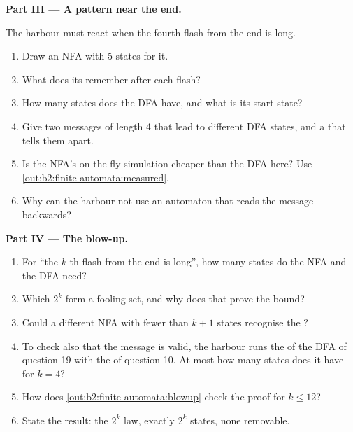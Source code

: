 \begin{problem}
\medskip\noindent\textbf{Part III --- A pattern near the end.}\par\nopagebreak
The harbour must react when the fourth flash from the end is long.
\begin{enumerate}[resume, beginpenalty=10000]
\item Draw an NFA with 5 states for it.
\item What does its  remember after each flash?
\item How many states does the DFA have, and what is its start state?
\item Give two messages of length 4 that lead to different DFA states, and a  that tells them apart.
\item Is the NFA's on-the-fly simulation cheaper than the DFA here? Use \cref{out:b2:finite-automata:measured}.
\item Why can the harbour not use an automaton that reads the message backwards?
\end{enumerate}

\medskip\noindent\textbf{Part IV --- The blow-up.}\par\nopagebreak
\begin{enumerate}[resume, beginpenalty=10000]
\item For ``the $k$-th flash from the end is long'', how many states do the NFA and the DFA need?
\item Which $2^k$  form a fooling set, and why does that prove the bound?
\item Could a different NFA with fewer than $k + 1$ states recognise the ?
\item To check also that the message is valid, the harbour runs the  of the DFA of question 19 with the  of question 10. At most how many states does it have for $k = 4$?
\item How does \cref{out:b2:finite-automata:blowup} check the proof for $k \le 12$?
\item State the result: the $2^k$ law, exactly $2^k$ states, none removable.
\end{enumerate}
\end{problem}
